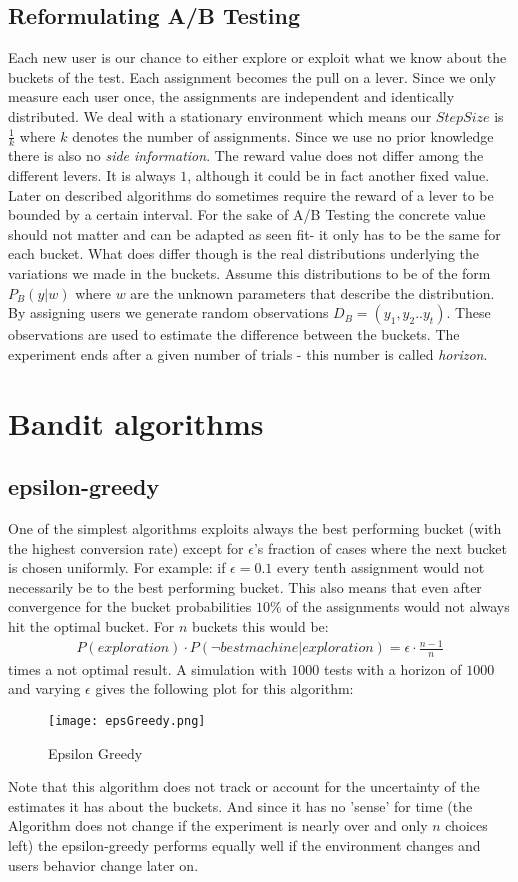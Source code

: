 \documentclass[main.tex]{subfiles}
\begin{document}
\subsection{Reformulating A/B Testing}
Each new user is our chance to either explore or exploit what we know about the buckets of the test. Each assignment becomes the pull on a lever. Since we only measure each user once, the assignments are independent and identically distributed. We deal with a stationary environment which means our $StepSize$ is $\frac{1}{k}$ where $k$ denotes the number of assignments. Since we use no prior knowledge there is also no \emph{side information}. The reward value does not differ among the different levers. It is always $1$, although it could be in fact another fixed value. Later on described algorithms do sometimes require the reward of a lever to be bounded by a certain interval. For the sake of A/B Testing the concrete value should not matter and can be adapted as seen fit- it only has to be the same for each bucket. What does differ though is the real distributions underlying the variations we made in the buckets. Assume this distributions to be of the form $P_B(y|w)$ where $w$ are the unknown parameters that describe the distribution. By assigning users we generate random observations $D_B=(y_1,y_2..y_t)$. These observations are used to estimate the difference between the buckets. The experiment ends after a given number of trials - this number is called \emph{horizon}.

\section{Bandit algorithms}
\subsection{epsilon-greedy}
One of the simplest algorithms exploits always the best performing bucket (with the highest conversion rate) except for $\epsilon $'s fraction of cases where the next bucket is chosen uniformly. For example: if $\epsilon = 0.1$ every tenth assignment would not necessarily be to the best performing bucket. This also means that even after convergence for the bucket probabilities $10\%$ of the assignments would not always hit the optimal bucket. For $n$ buckets this would be:
\begin{align*}
P(exploration) \cdot P(\neg best machine | exploration) = \epsilon \cdot \frac{n-1}{n}
\end{align*}
times a not optimal result. A simulation with $1000$ tests with a horizon of $1000$ and varying $\epsilon$ gives the following plot for this algorithm:
\begin{figure}[ht]
\texttt{[image: epsGreedy.png]}
\centering
\caption{Epsilon Greedy}
\label{fig:EpsGreedy}
\end{figure}
Note that this algorithm does not track or account for the uncertainty of the estimates it has about the buckets. And since it has no 'sense' for time (the Algorithm does not change if the experiment is nearly over and only $n$ choices left) the epsilon-greedy performs equally well if the environment changes and users behavior change later on.
\end{document}
